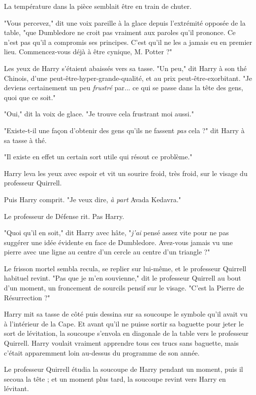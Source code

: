 La température dans la pièce semblait être en train de chuter.

"Vous percevez," dit une voix pareille à la glace depuis l'extrémité opposée de la table, "que Dumbledore ne croit pas vraiment aux paroles qu'il prononce. Ce n'est pas qu'il a compromis ses principes. C'est qu'il ne les a jamais eu en premier lieu. Commencez-vous déjà à être cynique, M. Potter ?"

Les yeux de Harry s'étaient abaissés vers sa tasse. "Un peu," dit Harry à son thé Chinois, d'une peut-être-hyper-grande-qualité, et au prix peut-être-exorbitant. "Je deviens certainement un peu \emph{frustré}  par... ce qui se passe dans la tête des gens, quoi que ce soit."

"Oui," dit la voix de glace. "Je trouve cela frustrant moi aussi."

"Existe-t-il une façon d'obtenir des gens qu'ils ne fassent \emph{pas}  cela ?" dit Harry à sa tasse à thé.

"Il existe en effet un certain sort utile qui résout ce problème."

Harry leva les yeux avec espoir et vit un sourire froid, très froid, sur le visage du professeur Quirrell.

Puis Harry comprit. "Je veux dire, \emph{à part}  Avada Kedavra."

Le professeur de Défense rit. Pas Harry.

"Quoi qu'il en soit," dit Harry avec hâte, "\emph{j'ai}  pensé assez vite pour ne pas suggérer une idée évidente en face de Dumbledore. Avez-vous jamais vu une pierre avec une ligne au centre d'un cercle au centre d'un triangle ?"

Le frisson mortel sembla recula, se replier sur lui-même, et le professeur Quirrell habituel revint. "Pas que je m'en souvienne," dit le professeur Quirrell au bout d'un moment, un froncement de sourcils pensif sur le visage. "C'est la Pierre de Résurrection ?"

Harry mit sa tasse de côté puis dessina sur sa soucoupe le symbole qu'il avait vu à l'intérieur de la Cape. Et avant qu'il ne puisse sortir sa baguette pour jeter le sort de lévitation, la soucoupe s'envola en diagonale de la table vers le professeur Quirrell. Harry voulait vraiment apprendre tous ces trucs sans baguette, mais c'était apparemment loin au-dessus du programme de son année.

Le professeur Quirrell étudia la soucoupe de Harry pendant un moment, puis il secoua la tête ; et un moment plus tard, la soucoupe revint vers Harry en lévitant.

